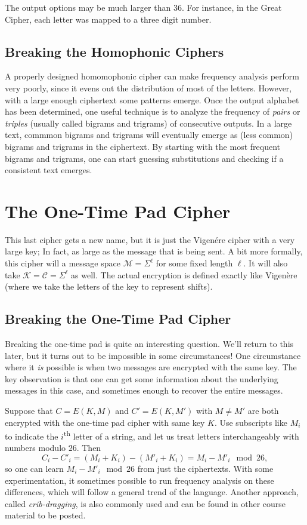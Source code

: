 \documentclass[11pt]{article}
\newcommand{\msgs}{\mathcal{M}}
\newcommand{\ctxts}{\mathcal{C}}
\newcommand{\keys}{\mathcal{K}}
\newcommand{\enc}{E}
\begin{document}
The output options may be much larger than 36. For instance, in the
Great Cipher, each letter was mapped to a three digit number.

\subsection{Breaking the Homophonic Ciphers}

A properly designed homomophonic cipher can make frequency analysis perform
very poorly, since it evens out the distribution of most of the letters.
However, with a large enough ciphertext some patterns emerge. Once the output
alphabet has been determined, one useful technique is to analyze the frequency
of \emph{pairs} or \emph{triples} (usually called bigrams and trigrams) of
consecutive outputs.  In a large text, commmon bigrams and trigrams will
eventually emerge as (less common) bigrams and trigrams in the ciphertext. By
starting with the most frequent bigrams and trigrams, one can start guessing
substitutions and checking if a consistent text emerges.

\section{The One-Time Pad Cipher}

This last cipher gets a new name, but it is just the Vigen\'{e}re cipher
with a very large key; In fact, as large as the message that is being
sent. A bit more formally, this cipher will a message space
$\msgs = \Sigma^\ell$ for some fixed length $\ell$. It will also
take $\keys=\ctxts=\Sigma^\ell$ as well. The actual encryption
is defined exactly like Vigen\`{e}re (where we take the letters
of the key to represent shifts).

\subsection{Breaking the One-Time Pad Cipher}

Breaking the one-time pad is quite an interesting question. We'll return
to this later, but it turns out to be impossible in some circumstances!
One circumstance where it \emph{is} possible is when two messages are
encrypted with the same key. The key observation is that one can get
some information about the underlying messages in this case, and sometimes
enough to recover the entire messages.

Suppose that $C=\enc(K,M)$ and $C'=\enc(K,M')$
with $M\neq M'$ are both encrypted with the one-time pad cipher with same
key $K$. 
Use subscripts like $M_i$ to indicate the $i$\textsuperscript{th}
letter of a string, and let us treat letters interchangeably with
numbers modulo $26$.
Then
\[
    C_i - C'_i = (M_i+K_i) - (M'_i+K_i) = M_i - M'_i \mod 26,
\]
so one can learn $M_i-M'_i\mod 26$ from just the ciphertexts.
With some experimentation, it sometimes possible to run frequency analysis
on these differences, which will follow a general trend of the language.
Another approach, called \emph{crib-dragging}, is also commonly used
and can be found in other course material to be posted.
\end{document}
